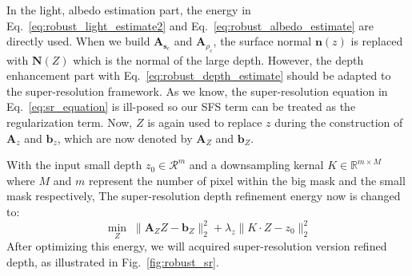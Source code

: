 In the light, albedo estimation part, the energy in Eq.~\ref{eq:robust_light_estimate2} and Eq.~\ref{eq:robust_albedo_estimate} are directly used. When we build $\mathbf{A}_{\mathbf{s}_c}$ and $\mathbf{A}_{\rho_c}$, the surface normal $\mathbf{n}(z)$ is replaced with $\mathbf{N}(Z)$ which is the normal of the large depth. 
However, the depth enhancement part with Eq.~\ref{eq:robust_depth_estimate} should be adapted to the super-resolution framework. 
As we know, the super-resolution equation in Eq.~\ref{eq:sr_equation} is ill-posed so our SFS term can be treated as the regularization term.
Now, $Z$ is again used to replace $z$ during the construction of $\mathbf{A}_z$ and $\mathbf{b}_z$, which are now denoted by $\mathbf{A}_Z$ and $\mathbf{b}_Z$.
 
With the input small depth $z_0\in\mathcal{R}^m$ and a downsampling kernal $K \in \mathbb{R}^{m\times M}$ where $M$ and $m$ represent the number of pixel within the big mask and the small mask respectively, The super-resolution depth refinement energy now is changed to:
 \begin{equation}\label{eq:robust_depth_estimate}
	\min_{Z} \; \lVert  \mathbf{A}_{Z}Z - \mathbf{b}_Z\rVert^2_2 + \lambda_{z}\lVert K\cdot Z - z_0 \rVert_2^2
\end{equation}
 After optimizing this energy, we will acquired super-resolution version refined depth, as illustrated in Fig.~\ref{fig:robust_sr}.
